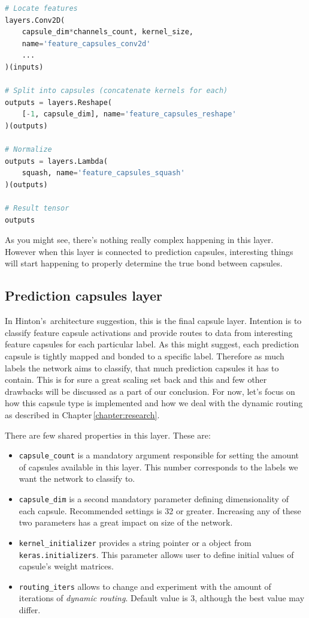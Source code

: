 \begin{lstlisting}[language=Python, caption=Features capsule implementation.]
# Locate features
layers.Conv2D(
    capsule_dim*channels_count, kernel_size,
    name='feature_capsules_conv2d'
    ...
)(inputs)

# Split into capsules (concatenate kernels for each)
outputs = layers.Reshape(
    [-1, capsule_dim], name='feature_capsules_reshape'
)(outputs)

# Normalize
outputs = layers.Lambda(
    squash, name='feature_capsules_squash'
)(outputs)

# Result tensor
outputs
\end{lstlisting}

As you might see, there's nothing really complex happening in this layer. However when this layer is connected to prediction capsules, interesting things will start happening to properly determine the true bond between capsules.

\subsection{Prediction capsules layer}

In Hinton's\,\cite{capsule} architecture suggestion, this is the final capsule layer. Intention is to classify feature capsule activations and provide routes to data from interesting feature capsules
for each particular label. As this might suggest, each prediction capsule is tightly mapped and bonded to a specific label. Therefore as much labels the network aims to classify, that much prediction capsules it has to contain. This is for sure a great scaling set back and this and few other drawbacks will be discussed as a part of our conclusion. For now, let's focus on how this capsule type is implemented and how we deal with the dynamic routing as described in Chapter\,\ref{chapter:research}.

There are few shared properties in this layer. These are:

\begin{itemize}
    \item \texttt{capsule\_count} is a mandatory argument responsible for setting the amount of capsules available in this layer. This number corresponds to the labels we want the network to classify to.
    \item \texttt{capsule\_dim} is a second mandatory parameter defining dimensionality of each capsule. Recommended settings is 32 or greater. Increasing any of these two parameters has a great impact on size of the network.
    \item \texttt{kernel\_initializer} provides a string pointer or a object from \texttt{keras.initializers}. This parameter allows user to define initial values of capsule's weight matrices.
    \item \texttt{routing\_iters} allows to change and experiment with the amount of iterations of \textit{dynamic routing}. Default value is 3, although the best value may differ.
\end{itemize}

